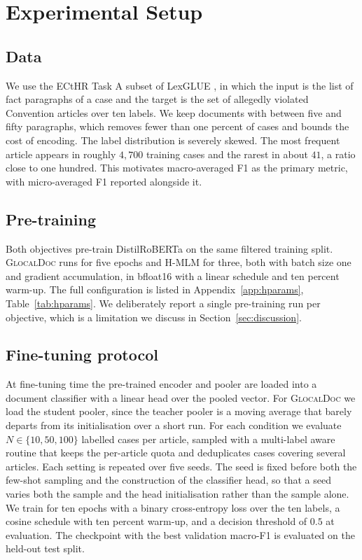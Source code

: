 \documentclass[conference]{IEEEtran}
\newcommand{\glocal}{\textsc{GlocalDoc}}
\newcommand{\hmlm}{\mbox{H-MLM}}
\begin{document}
\section{Experimental Setup}
\label{sec:setup}

\subsection{Data}
We use the ECtHR Task A subset of LexGLUE \cite{chalkidis2022lexglue}, in which the
input is the list of fact paragraphs of a case and the target is the set of
allegedly violated Convention articles over ten labels. We keep documents with
between five and fifty paragraphs, which removes fewer than one percent of cases and
bounds the cost of encoding. The label distribution is severely skewed. The most
frequent article appears in roughly $4{,}700$ training cases and the rarest in about
$41$, a ratio close to one hundred. This motivates macro-averaged F1 as the primary
metric, with micro-averaged F1 reported alongside it.

\subsection{Pre-training}
Both objectives pre-train DistilRoBERTa \cite{sanh2019distilbert} on the same
filtered training split. \glocal{} runs for five epochs and \hmlm{} for three, both
with batch size one and gradient accumulation, in bfloat16 with a linear schedule
and ten percent warm-up. The full configuration is listed in
Appendix~\ref{app:hparams}, Table~\ref{tab:hparams}. We deliberately report a single
pre-training run per objective, which is a limitation we discuss in
Section~\ref{sec:discussion}.

\subsection{Fine-tuning protocol}
At fine-tuning time the pre-trained encoder and pooler are loaded into a document
classifier with a linear head over the pooled vector. For \glocal{} we load the
student pooler, since the teacher pooler is a moving average that barely departs from
its initialisation over a short run. For each condition we evaluate
$N \in \{10, 50, 100\}$ labelled cases per article, sampled with a multi-label aware
routine that keeps the per-article quota and deduplicates cases covering several
articles. Each setting is repeated over five seeds. The seed is fixed before both
the few-shot sampling and the construction of the classifier head, so that a seed
varies both the sample and the head initialisation rather than the sample alone. We
train for ten epochs with a binary cross-entropy loss over the ten labels, a cosine
schedule with ten percent warm-up, and a decision threshold of $0.5$ at evaluation.
The checkpoint with the best validation macro-F1 is evaluated on the held-out test
split.
\end{document}

